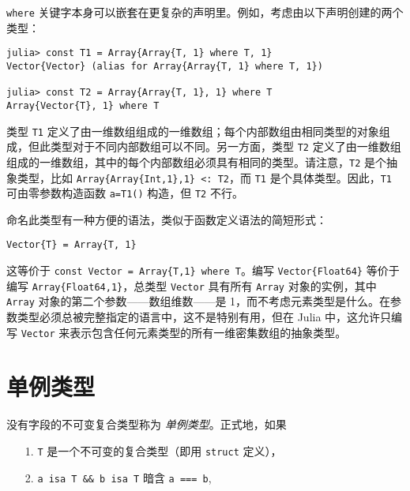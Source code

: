 \texttt{where} 关键字本身可以嵌套在更复杂的声明里。例如，考虑由以下声明创建的两个类型：




\begin{verbatim}
julia> const T1 = Array{Array{T, 1} where T, 1}
Vector{Vector} (alias for Array{Array{T, 1} where T, 1})

julia> const T2 = Array{Array{T, 1}, 1} where T
Array{Vector{T}, 1} where T
\end{verbatim}



类型 \texttt{T1} 定义了由一维数组组成的一维数组；每个内部数组由相同类型的对象组成，但此类型对于不同内部数组可以不同。另一方面，类型 \texttt{T2} 定义了由一维数组组成的一维数组，其中的每个内部数组必须具有相同的类型。请注意，\texttt{T2} 是个抽象类型，比如 \texttt{Array\{Array\{Int,1\},1\} <: T2}，而 \texttt{T1} 是个具体类型。因此，\texttt{T1} 可由零参数构造函数 \texttt{a=T1()} 构造，但 \texttt{T2} 不行。



命名此类型有一种方便的语法，类似于函数定义语法的简短形式：




\begin{verbatim}
Vector{T} = Array{T, 1}
\end{verbatim}



这等价于 \texttt{const Vector = Array\{T,1\} where T}。编写 \texttt{Vector\{Float64\}} 等价于编写 \texttt{Array\{Float64,1\}}，总类型 \texttt{Vector} 具有所有 \texttt{Array} 对象的实例，其中 \texttt{Array} 对象的第二个参数——数组维数——是 1，而不考虑元素类型是什么。在参数类型必须总被完整指定的语言中，这不是特别有用，但在 Julia 中，这允许只编写 \texttt{Vector} 来表示包含任何元素类型的所有一维密集数组的抽象类型。



\hypertarget{647919389478144252}{}


\section{单例类型}



没有字段的不可变复合类型称为 \emph{单例类型}。正式地，如果



\begin{itemize}
\item[1. ] \texttt{T} 是一个不可变的复合类型（即用 \texttt{struct} 定义），


\item[2. ] \texttt{a isa T \&\& b isa T} 暗含 \texttt{a === b},

\end{itemize}


